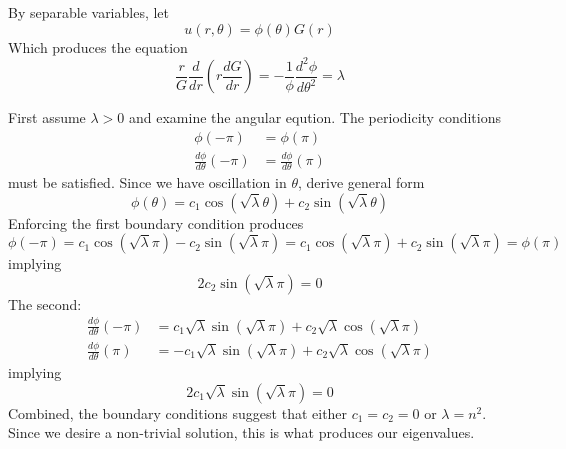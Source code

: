 \documentclass[a4paper]{article}
\begin{document}

By separable variables, let 
\[
	u \!\left( r,\theta \right) = \phi \!\left( \theta \right)G \!\left( r \right) 
\]
Which produces the equation
\[
	\frac{r}{G}\frac{d }{d r}\!\left( r \frac{d G}{d r} \right) = -\frac{1}{\phi}\frac{d^2 \phi}{d \theta^2} = \lambda 
\]

First assume \( \lambda > 0 \) and examine the angular eqution. The periodicity conditions
\begin{align*}
	\phi \!\left( -\pi \right) & = \phi \!\left( \pi \right) \\
	\frac{d \phi}{d \theta}\!\left( -\pi \right) & = \frac{d \phi}{d \theta}\!\left( \pi \right)
\end{align*}
must be satisfied. Since we have oscillation in \( \theta \), derive general form
\[
	\phi \!\left( \theta \right) = c_{1}\cos\!\left(\sqrt{\lambda}\theta\right) + c_{2}\sin\!\left(\sqrt{\lambda}\theta\right) 
\]
Enforcing the first boundary condition produces
\[
	\phi \!\left( -\pi \right) = c_{1}\cos\!\left(\sqrt{\lambda}\pi\right) - c_{2}\sin\!\left(\sqrt{\lambda}\pi\right) = c_{1}\cos\!\left(\sqrt{\lambda}\pi\right) + c_{2}\sin\!\left(\sqrt{\lambda}\pi\right) = \phi \!\left( \pi \right)
\]
implying
\[
	2c_{2}\sin\!\left(\sqrt{\lambda}\pi\right) = 0
\]
The second:
\begin{align*}
	\frac{d \phi}{d \theta}\!\left( -\pi \right) & = c_{1}\sqrt{\lambda}\sin\!\left(\sqrt{\lambda}\pi\right) + c_{2}\sqrt{\lambda} \cos\!\left(\sqrt{\lambda} \pi\right) \\
	\frac{d \phi}{d \theta}\!\left( \pi \right) & = -c_{1}\sqrt{\lambda}\sin\!\left(\sqrt{\lambda}\pi\right) + c_{2}\sqrt{\lambda}\cos\!\left(\sqrt{\lambda}\pi\right)
\end{align*}
implying
\[
	2c_{1}\sqrt{\lambda}\sin\!\left(\sqrt{\lambda}\pi\right) = 0 
\]
Combined, the boundary conditions suggest that either \( c_{1} = c_{2} = 0 \) or \( \lambda = n^{2} \). Since we desire a non-trivial solution, this is what produces our eigenvalues.
\end{document}
